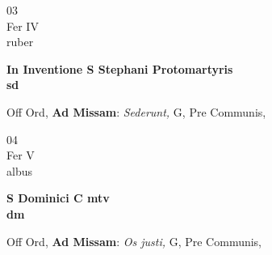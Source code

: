 \documentclass[10pt, openany]{book}
\begin{document}
        \begin{center}
            \begin{minipage}{3.5in}
                \vspace{2em}
                \begin{minipage}{0.5in}
                    {\Huge 03} \\
                    {\normalsize Fer IV} \\
                    {\normalsize ruber}
                \end{minipage}
                \begin{minipage}{3.0in}
                    \textbf{ \large In Inventione S Stephani Protomartyris \\
                    \textnormal{\normalsize sd}} \\ 
                \end{minipage}
                \begin{justify}Off Ord, \textbf{Ad Missam}: \textit{Sederunt,} G, Pre Communis,   
                \end{justify}
            \end{minipage}
        \end{center}
    
        \begin{center}
            \begin{minipage}{3.5in}
                \vspace{2em}
                \begin{minipage}{0.5in}
                    {\Huge 04} \\
                    {\normalsize Fer V} \\
                    {\normalsize albus}
                \end{minipage}
                \begin{minipage}{3.0in}
                    \textbf{ \large S Dominici C mtv \\
                    \textnormal{\normalsize dm}} \\ 
                \end{minipage}
                \begin{justify}Off Ord, \textbf{Ad Missam}: \textit{Os justi,} G, Pre Communis,   
                \end{justify}
            \end{minipage}
        \end{center}
    
\end{document}
